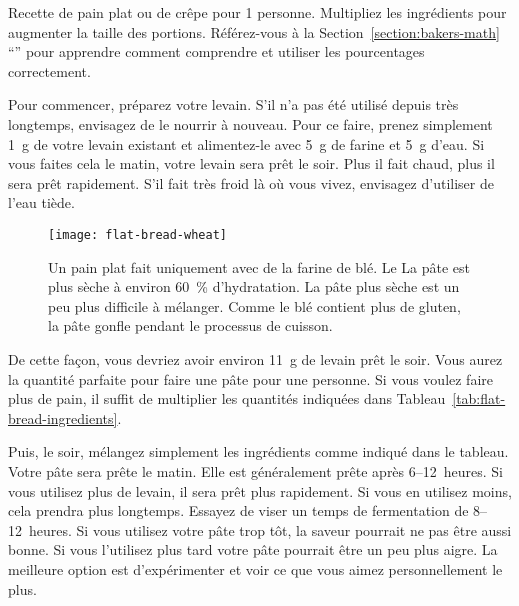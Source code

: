 \begin{table}[!htb]
    \begin{center}
        
        \caption[Recette de pain plat]{Recette de pain plat ou de crêpe pour 1 personne.
            Multipliez les ingrédients pour augmenter la taille des portions.  Référez-vous à la
            Section~\ref{section:bakers-math}
            ``'' pour apprendre comment comprendre et
            utiliser les pourcentages correctement.}%
            \label{tab:flat-bread-ingredients}
    \end{center}
\end{table}

Pour commencer, préparez votre levain. S'il n'a pas été utilisé depuis très longtemps, envisagez de le nourrir à nouveau. Pour ce faire, prenez simplement \qty{1}{\gram} de votre levain existant et alimentez-le avec \qty{5}{\gram} de farine et \qty{5}{\gram} d'eau. Si vous faites cela le matin, votre levain sera prêt le soir. Plus il fait chaud, plus il sera prêt rapidement. S'il fait très froid là où vous vivez, envisagez d'utiliser de l'eau tiède.

\begin{figure}[htb!]
\begin{center}
  \texttt{[image: flat-bread-wheat]}
  \caption[Pain plat de blé]{Un pain plat fait uniquement avec de la farine de blé. Le
      La pâte est plus sèche à environ \qty{60}{\percent} d'hydratation. La pâte plus sèche
      est un peu plus difficile à mélanger. Comme le blé contient plus de gluten, la pâte
      gonfle pendant le processus de cuisson.}
\end{center}
\end{figure}

De cette façon, vous devriez avoir environ \qty{11}{\gram} de levain prêt le soir. Vous aurez
la quantité parfaite pour faire une pâte pour une personne. Si vous voulez faire plus
de pain, il suffit de multiplier les quantités indiquées dans
Tableau~\ref{tab:flat-bread-ingredients}.

Puis, le soir, mélangez simplement les ingrédients comme indiqué dans le tableau. Votre pâte
sera prête le matin. Elle est généralement prête après 6--12~heures. Si
vous utilisez plus de levain, il sera prêt plus rapidement. Si vous en utilisez moins, cela prendra
plus longtemps. Essayez de viser un temps de fermentation de 8--12~heures. Si vous utilisez
votre pâte trop tôt, la saveur pourrait ne pas être aussi bonne. Si vous l'utilisez plus tard
votre pâte pourrait être un peu plus aigre. La meilleure option est d'expérimenter
et voir ce que vous aimez personnellement le plus.

